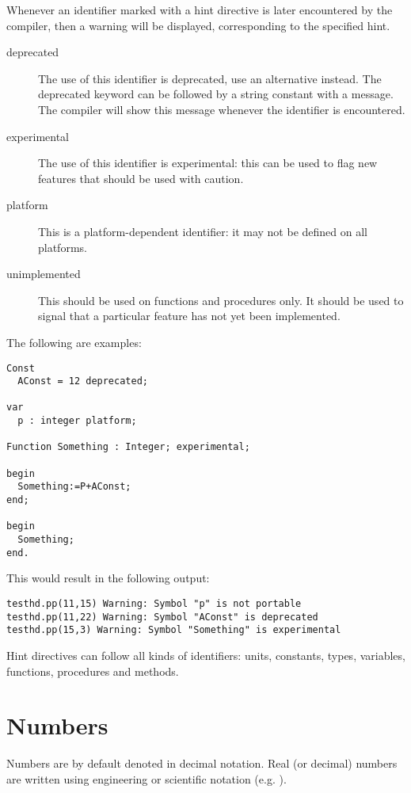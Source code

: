 
Whenever an identifier marked with a hint directive is  later encountered by
the compiler, then a warning will be displayed, corresponding to the
specified hint.
\begin{description}
\item[deprecated] The use of this identifier is deprecated, use an
alternative instead. The deprecated keyword can be followed by a string
constant with a message. The compiler will show this message whenever the
identifier is encountered. 
\item[experimental] The use of this identifier is experimental: this can be
used to flag new features that should be used with caution.
\item[platform] This is a platform-dependent identifier: it may not be
defined on all platforms. 
\item[unimplemented] This should be used on functions and procedures only.
It should be used to signal that a particular feature has not yet been
implemented. 
\end{description}

The following are examples:
\begin{verbatim}
Const
  AConst = 12 deprecated;

var
  p : integer platform;

Function Something : Integer; experimental;

begin
  Something:=P+AConst;
end;

begin
  Something;
end.
\end{verbatim}
This would result in the following output:
\begin{verbatim}
testhd.pp(11,15) Warning: Symbol "p" is not portable
testhd.pp(11,22) Warning: Symbol "AConst" is deprecated
testhd.pp(15,3) Warning: Symbol "Something" is experimental
\end{verbatim}

Hint directives can follow all kinds of identifiers: 
units, constants, types, variables, functions, procedures and methods.

\section{Numbers}
Numbers are by default denoted in decimal notation.
Real (or decimal) numbers are written using engineering or scientific
notation (e.g. ).

